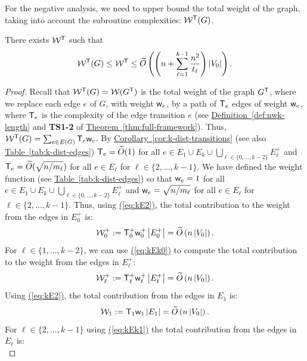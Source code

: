 \documentclass{theoretics}
\newcommand{\eq}[1]{\hyperref[eq:#1]{(\ref*{eq:#1})}}
\newcommand{\thm}[1]{\hyperref[thm:#1]{Theorem~\ref*{thm:#1}}}
\newcommand{\cor}[1]{\hyperref[cor:#1]{Corollary~\ref*{cor:#1}}}
\newcommand{\tabl}[1]{\hyperref[tab:#1]{Table~\ref*{tab:#1}}}
\newcommand{\defin}[1]{\hyperref[def:#1]{Definition~\ref*{def:#1}}}
\renewcommand{\>}{\rangle}
\newcommand{\<}{\langle}
\renewcommand{\(}{\left(}
\renewcommand{\)}{\right)}
\def\abs#1{\left| #1 \right|}
\def\w{{\sf w}}
\begin{document}
For the negative analysis, we need to upper bound the total weight of the graph, taking into account the subroutine complexities: ${\cal W}^{\sf T}(G)$.
\begin{lemma}\label{lem:k-dist-negative}
There exists ${\cal W}^{\sf T}$ such that
\begin{align*}
{\cal W}^{\sf T}(G) \leq  {\cal W}^{\sf T} 
\leq \widetilde{O}\left(\left(n  + \sum_{\ell=1}^{k-1} \frac{n^2}{t_{\ell}}\right)\abs{V_0}\right).
\end{align*}
\end{lemma}
\begin{proof}
Recall that ${\cal W}^{\sf T}(G)={\cal W}(G^{\sf T})$ is the total weight of the graph $G^{\sf T}$, where we replace each edge $e$ of $G$, with weight $\w_e$, by a path of ${\sf T}_e$ edges of weight $\w_e$, where ${\sf T}_e$ is the complexity of the edge transition $e$ (see \defin{nwk-length} and {\bf TS1-2} of \thm{full-framework}). Thus, ${\cal W}^{\sf T}(G)=\sum_{e\in E(G)}{\sf T}_e\w_e$. By \cor{k-dist-transitions} (see also \tabl{k-dist-edges}) ${\sf T}_e=\widetilde{O}(1)$ for all $e\in E_1 \cup E_k \cup \bigcup_{\ell \in \{0,\dots,k-2\}} E_{\ell}^{+}$ and ${\sf T}_e=\widetilde{O}(\sqrt{n/m_{\ell}})$ for all $e\in E_{\ell}$ for $\ell \in \{2,\dots,k-1\}$. We have defined the weight function (see \tabl{k-dist-edges}) so that $\w_e=1$ for all $e\in E_1 \cup E_k \cup \bigcup_{\ell \in \{0,\dots,k-2\}} E_{\ell}^{+}$ and $\w_e=\sqrt{n/m_{\ell}}$ for all $e\in E_{\ell}$ for $\ell \in \{2,\dots,k-1\}$.
Thus, using \eq{kE2}, the total contribution to the weight from the edges in $E_0^+$ is:
	\begin{equation}
		{\cal W}_0^+ := {\sf T}_0^+\w_0^+\abs{E_0^+}=\widetilde{O}\left(n\abs{V_0}\right).\label{eq:kW1}
	\end{equation}
For $\ell \in \{1,\dots,k-2\}$, we can use \eq{kEk0} to compute the total contribution to the weight from the edges in $E_{\ell}^+$:
	\begin{equation}
		{\cal W}_{\ell}^+ := {\sf T}_{\ell}^+\w_{\ell}^+\abs{E_{\ell}^+}=\widetilde{O}\left(n\abs{V_0}\right).\label{eq:kWk0}
	\end{equation}
Using \eq{kE2}, the total contribution from the edges in $E_1$ is:
	\begin{equation}
		{\cal W}_1 := {\sf T}_1\w_1\abs{E_1}=\widetilde{O}\left(n\abs{V_0}\right).\label{eq:kW2}
	\end{equation}
For $\ell \in \{2,\dots,k-1\}$ using \eq{kEk1} the total contribution from the edges in $E_{\ell}$ is:
	\begin{equation}

\end{equation}
\end{proof}
\end{document}
